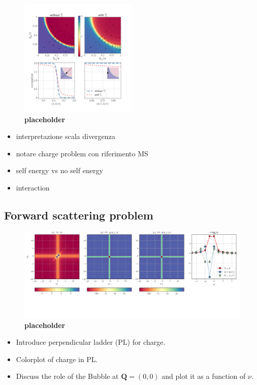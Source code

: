 \begin{figure}
\includegraphics[width=0.5\textwidth]{images/occupations_0600.png}
\caption{\textbf{placeholder}} 
\label{fig:occupation}
\end{figure}





\begin{itemize}
\item interpretazione scala divergenza
\item notare charge problem con riferimento MS 
\item self energy vs no self energy
\item interaction  
\end{itemize}   


\subsection{Forward scattering problem}

\begin{figure}
\includegraphics[width=\textwidth]{images/PL_all.png}
\caption{\textbf{placeholder}} 
\label{fig:perpladder}
\end{figure}


\begin{itemize}

\item Introduce perpendicular ladder (PL) for charge.

\item Colorplot of charge in PL.

\item Discuss the role of the Bubble at $\boldsymbol{Q}=(0,0)$ and plot it as a function of $\nu$.

\end{itemize}

